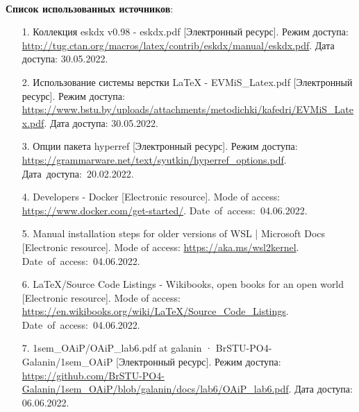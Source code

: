 \documentclass[12pt, a4paper, simple]{eskdtext}
\begin{document}
\newpage
\paragraph{} \textbf{Список использованных источников}:
\begin{enumerate}
    \item[1.] Коллекция eskdx v0.98 - eskdx.pdf
    [Электронный ресурс].
    Режим доступа: \url{http://tug.ctan.org/macros/latex/contrib/eskdx/manual/eskdx.pdf}.
    Дата доступа: 30.05.2022.

    \item[2.] Использование системы верстки LaTeX - EVMiS\_Latex.pdf
    [Электронный ресурс].
    Режим доступа: \url{https://www.bstu.by/uploads/attachments/metodichki/kafedri/EVMiS_Latex.pdf}.
    Дата доступа: 30.05.2022.

    \item[3.] Опции пакета hyperref
    [Электронный ресурс].
    Режим доступа: \url{https://grammarware.net/text/syutkin/hyperref_options.pdf}.
    Дата~доступа:~20.02.2022.

    \item[4.] Developers - Docker
    [Electronic resource].
    Mode of access: \url{https://www.docker.com/get-started/}.
    Date~of~access:~04.06.2022.

    \item[5.] Manual installation steps for older versions of WSL | Microsoft Docs
    [Electronic resource].
    Mode of access: \url{https://aka.ms/wsl2kernel}.
    Date~of~access:~04.06.2022.

    \item[6.] LaTeX/Source Code Listings - Wikibooks, open books for an open world
    [Electronic resource].
    Mode of access: \url{https://en.wikibooks.org/wiki/LaTeX/Source_Code_Listings}.
    Date~of~access:~04.06.2022.

    \item[7.] 1sem\_OAiP/OAiP\_lab6.pdf at galanin · BrSTU-PO4-Galanin/1sem\_OAiP
    [Электронный ресурс].
    Режим доступа: \url{https://github.com/BrSTU-PO4-Galanin/1sem_OAiP/blob/galanin/docs/lab6/OAiP_lab6.pdf}.
    Дата доступа: 06.06.2022.
\end{enumerate}

\newpage
\end{document}
